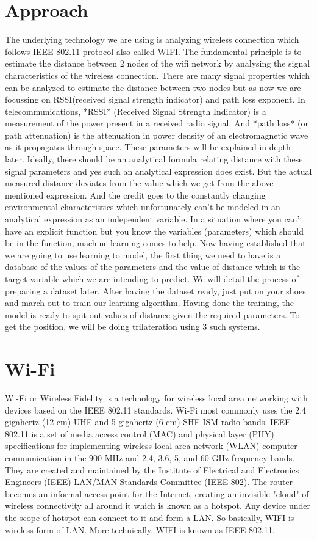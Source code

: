 \documentclass[12pt]{article}
\begin{document}
\section{Approach}
The underlying technology we are using is analyzing wireless connection which follows IEEE 802.11 protocol also called WIFI. 
The fundamental principle is to estimate the distance between 2 nodes of the wifi network by analysing the signal characteristics of the wireless connection. There are many signal properties which can be analyzed to estimate the distance between two nodes but as now we are focussing on RSSI(received signal strength indicator) and path loss exponent. In telecommunications, *RSSI* (Received Signal Strength Indicator) is a measurement of the power present in a received radio signal. And *path loss* (or path attenuation) is the attenuation in power density of an electromagnetic wave as it propagates through space. These parameters will be explained in depth later.
Ideally, there should be an analytical formula relating distance with these signal parameters and yes such an analytical expression does exist. But the actual measured distance deviates from the value which we get from the above mentioned expression. And the credit goes to the constantly changing environmental characteristics which unfortunately can't be modeled in an analytical expression as an independent variable. In a situation where you can't have an explicit function but you know the variables (parameters) which should be in the function, machine learning comes to help. Now having established that we are going to use learning to model, the first thing we need to have is a database of the values of the parameters and the value of distance which is the target variable which we are intending to predict. 
We will detail the process of preparing a dataset later. After having the dataset ready, just put on your shoes and march out to train our learning algorithm. Having done the training, the model is ready to spit out values of distance given the required parameters. To get the position, we will be doing trilateration using 3 such systems.

\section{Wi-Fi}
Wi-Fi or Wireless Fidelity is a technology for wireless local area networking with devices based on the IEEE 802.11 standards. Wi-Fi most commonly uses the 2.4 gigahertz (12 cm) UHF and 5 gigahertz (6 cm) SHF ISM radio bands.
IEEE 802.11 is a set of media access control (MAC) and physical layer (PHY) specifications for implementing wireless local area network (WLAN) computer communication in the 900 MHz and 2.4, 3.6, 5, and 60 GHz frequency bands. They are created and maintained by the Institute of Electrical and Electronics Engineers (IEEE) LAN/MAN Standards Committee (IEEE 802). 
The router becomes an informal access point for the Internet, creating an invisible "cloud" of wireless connectivity all around it which is known as a hotspot. Any device under the scope of hotspot can connect to it and form a LAN. So basically, WIFI is wireless form of LAN. More technically, WIFI is known as IEEE 802.11.
\end{document}
